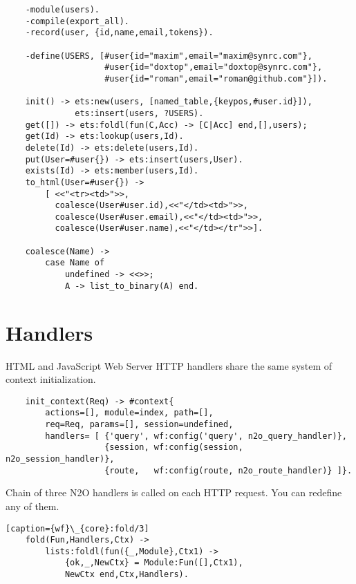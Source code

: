 \vspace{1\baselineskip}
\begin{lstlisting}
    -module(users).
    -compile(export_all).
    -record(user, {id,name,email,tokens}).

    -define(USERS, [#user{id="maxim",email="maxim@synrc.com"},
                    #user{id="doxtop",email="doxtop@synrc.com"},
                    #user{id="roman",email="roman@github.com"}]).

    init() -> ets:new(users, [named_table,{keypos,#user.id}]),
              ets:insert(users, ?USERS).
    get([]) -> ets:foldl(fun(C,Acc) -> [C|Acc] end,[],users);
    get(Id) -> ets:lookup(users,Id).
    delete(Id) -> ets:delete(users,Id).
    put(User=#user{}) -> ets:insert(users,User).
    exists(Id) -> ets:member(users,Id).
    to_html(User=#user{}) ->
        [ <<"<tr><td>">>,
          coalesce(User#user.id),<<"</td><td>">>,
          coalesce(User#user.email),<<"</td><td>">>,
          coalesce(User#user.name),<<"</td></tr">>].

    coalesce(Name) -> 
        case Name of 
            undefined -> <<>>;
            A -> list_to_binary(A) end.
\end{lstlisting}
\vspace{1\baselineskip}

\section{Handlers}
HTML and JavaScript Web Server HTTP handlers share the same system
of context initialization. 

\vspace{1\baselineskip}
\begin{lstlisting}
    init_context(Req) -> #context{
        actions=[], module=index, path=[],
        req=Req, params=[], session=undefined,
        handlers= [ {'query', wf:config('query', n2o_query_handler)},
                    {session, wf:config(session, n2o_session_handler)},
                    {route,   wf:config(route, n2o_route_handler)} ]}.
\end{lstlisting}
\vspace{1\baselineskip}

Chain of three N2O handlers is called
on each HTTP request. You can redefine any of them.

\vspace{1\baselineskip}
\begin{lstlisting}[caption={wf}\_{core}:fold/3]
    fold(Fun,Handlers,Ctx) ->
        lists:foldl(fun({_,Module},Ctx1) ->
            {ok,_,NewCtx} = Module:Fun([],Ctx1),
            NewCtx end,Ctx,Handlers).
\end{lstlisting}
\vspace{1\baselineskip}

